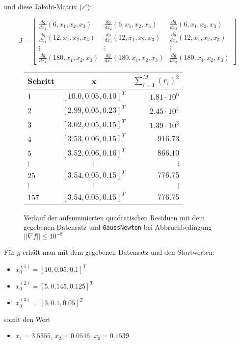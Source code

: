 \documentclass[a4paper, 12pt]{report}
\begin{document}
und diese Jakobi-Matrix ($r'$):

$$ J = \begin{bmatrix}
  \frac{dg}{dx_1}(6, x_1, x_2, x_3) & \frac{dg}{dx_2}(6, x_1, x_2, x_3) & \frac{dg}{dx_3}(6, x_1, x_2, x_3)\\
  \frac{dg}{dx_1}(12, x_1, x_2, x_3) & \frac{dg}{dx_2}(12, x_1, x_2, x_3) & \frac{dg}{dx_3}(12, x_1, x_2, x_3)\\
  \vdots & \vdots & \vdots\\
  \frac{dg}{dx_1}(180, x_1, x_2, x_3) & \frac{dg}{dx_2}(180, x_1, x_2, x_3) & \frac{dg}{dx_3}(180, x_1, x_2, x_3)
\end{bmatrix}$$

\begin{figure}[H]
  \centering
  \def\arraystretch{1.25}
  \begin{tabular}{l|c|r}
    \hline
    \textbf{Schritt} & \textbf{x} & \textbf{$\sum_{i=1}^M (r_i)^2$}\\
    \hline
    1 & $[10.0, 0.05, 0.10]^T$ & $1.81\cdot 10^{6}$\\
    2 & $[2.99, 0.05, 0.23]^T$ & $2.45\cdot 10^{4}$\\
    3 & $[3.02, 0.05, 0.15]^T$ & $1.39\cdot 10^{3}$\\
    4 & $[3.53, 0.06, 0.15]^T$ & $916.73$\\
    5 & $[3.52, 0.06, 0.16]^T$ & $866.10$\\
    $\vdots$ & $\vdots$ & $\vdots$\\
    25 & $[3.54, 0.05, 0.15]^T$ & $776.75$\\
    $\vdots$ & $\vdots$ & $\vdots$\\
    157 & $[3.54, 0.05, 0.15]^T$ & $776.75$\\
    \hline
  \end{tabular}
  \caption{Verlauf der aufsummierten quadratischen Residuen mit dem gegebenen Datensatz und
        \lstinline[basicstyle=\ttfamily\color{black}]|GaussNewton| bei Abbruchbedingung $||\nabla f|| \leq 10^{-8}$}
\end{figure}

Für $g$ erhält man mit dem gegebenen Datensatz und den Startwerten:
\begin{itemize}
  \item $x_0^{(1)} = [10, 0.05, 0.1]^T$
  \item $x_0^{(2)} = [5, 0.145, 0.125]^T$
  \item $x_0^{(3)} = [3, 0.1, 0.05]^T$
\end{itemize}
somit den Wert
\begin{itemize}
  \item $x_1 = 3.5355$, $x_2 = 0.0546$, $x_3 = 0.1539$
\end{itemize}
\end{document}
